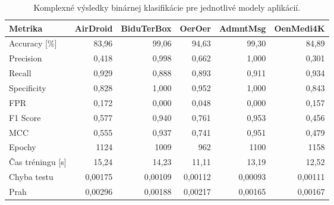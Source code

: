 \begin{table}[H]
    \centering
    \caption{Komplexné výsledky binárnej klasifikácie pre jednotlivé modely aplikácií.}
    \label{tab:each_model_all_metrics}
    \small
    \begin{tabular}{lrrrrr}
        \toprule
        \textbf{Metrika} & \textbf{AirDroid} & \textbf{BiduTerBox} & \textbf{OerOer} & \textbf{AdmntMsg} & \textbf{OenMedi4K} \\
        \midrule
        Accuracy [\%]    & 83,96    & 99,06    & 94,63    & 99,30    & 84,89    \\
        Precision        & 0,418    & 0,998    & 0,662    & 1,000    & 0,301    \\
        Recall           & 0,929    & 0,888    & 0,893    & 0,911    & 0,934    \\
        Specificity      & 0,828    & 1,000    & 0,952    & 1,000    & 0,843    \\
        FPR              & 0,172    & 0,000    & 0,048    & 0,000    & 0,157    \\
        F1 Score         & 0,577    & 0,940    & 0,761    & 0,953    & 0,456    \\
        MCC              & 0,555    & 0,937    & 0,741    & 0,951    & 0,479    \\
        \midrule
        Epochy           & 1124     & 1009     & 962      & 1100     & 1158     \\
        Čas tréningu [s] & 15,24    & 14,23    & 11,11    & 13,19    & 12,52    \\
        Chyba testu      & 0,00175  & 0,00109  & 0,00112  & 0,00093  & 0,00111  \\
        Prah             & 0,00296  & 0,00188  & 0,00217  & 0,00165  & 0,00167  \\
        \bottomrule
    \end{tabular}
\end{table}